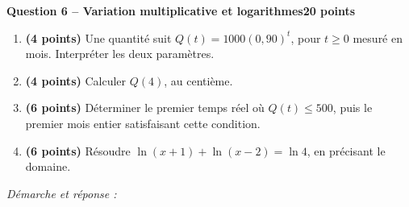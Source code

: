 \documentclass[11pt,a4paper]{article}
\begin{document}
\newpage
{\large\bfseries Question 6 -- Variation multiplicative et logarithmes}\hfill\textbf{20 points}\par
\begin{enumerate}
\item \textbf{(4 points)} Une quantité suit \(Q(t)=1000(0{,}90)^t\), pour \(t\ge0\) mesuré en mois. Interpréter les deux paramètres.
\item \textbf{(4 points)} Calculer \(Q(4)\), au centième.
\item \textbf{(6 points)} Déterminer le premier temps réel où \(Q(t)\le500\), puis le premier mois entier satisfaisant cette condition.
\item \textbf{(6 points)} Résoudre \(\ln(x+1)+\ln(x-2)=\ln4\), en précisant le domaine.
\end{enumerate}
\vspace{3mm}\textit{Démarche et réponse :}\par\vfill
\end{document}
